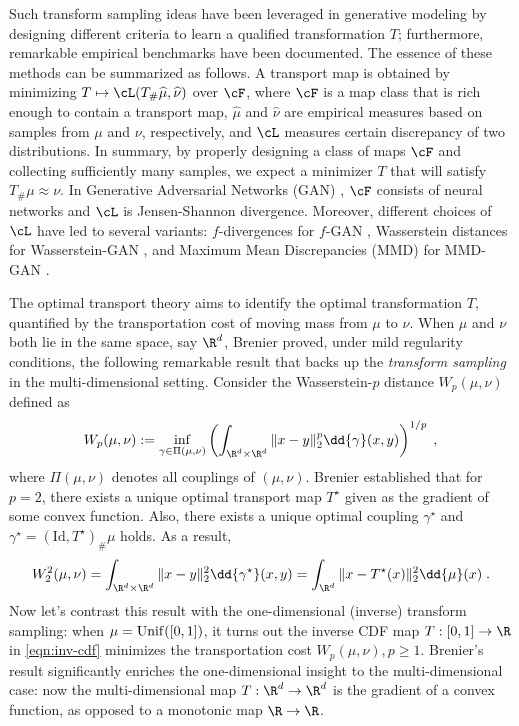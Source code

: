 \documentclass[11pt]{article}
\begin{document}
Such transform sampling ideas have been leveraged in generative modeling by designing different criteria to learn a qualified transformation $T$; furthermore, remarkable empirical benchmarks have been documented. The essence of these methods can be summarized as follows. A transport map is obtained by minimizing $T \mapsto \cL(T_{\#} \widehat{\mu}, \widehat{\nu})$ over $\cF$, where $\cF$ is a map class that is rich enough to contain a transport map, $\widehat{\mu}$ and $\widehat{\nu}$ are empirical measures based on samples from $\mu$ and $\nu$, respectively, and $\cL$ measures certain discrepancy of two distributions. In summary, by properly designing a class of maps $\cF$ and collecting sufficiently many samples, we expect a minimizer $T$ that will satisfy $T_{\#} \mu \approx \nu$. In Generative Adversarial Networks (GAN) \citep{goodfellow_2014}, $\cF$ consists of neural networks and $\cL$ is Jensen-Shannon divergence. Moreover, different choices of $\cL$ have led to several variants: $f$-divergences for $f$-GAN \citep{nowozin_2016}, Wasserstein distances for Wasserstein-GAN \citep{arjovsky_2017}, and Maximum Mean Discrepancies (MMD) for MMD-GAN \citep{dziugaite_roy_ghahramani_2015, li_swersky_zemel_2015}.

The optimal transport theory aims to identify the optimal transformation $T$, quantified by the transportation cost of moving mass from $\mu$ to $\nu$. When $\mu$ and $\nu$ both lie in the same space, say $\R^d$, Brenier \citep{brenier1991} proved, under mild regularity conditions, the following remarkable result that backs up the \textit{transform sampling} in the multi-dimensional setting. Consider the Wasserstein-$p$ distance $W_p(\mu, \nu)$ defined as
\begin{align*}
	W_p(\mu, \nu) := \inf_{\gamma \in \Pi(\mu, \nu)} \left(  \int_{\R^d \times \R^d} \| x - y \|_2^p \dd{\gamma}(x, y) \right)^{1/p} \;,
\end{align*}
where $\Pi(\mu, \nu)$ denotes all couplings of $(\mu, \nu)$.
Brenier established that for $p = 2$, there exists a unique optimal transport map $T^{\star}$ given as the gradient of some convex function. Also, there exists a unique optimal coupling $\gamma^{\star}$ and $\gamma^{\star} = (\mathrm{Id}, T^{\star})_{\#} \mu$ holds. As a result,
\begin{align*}
 	W_2^2(\mu, \nu) = \int_{\R^d \times \R^d} \|x - y\|_2^2 \dd{\gamma^{\star}}(x, y) = \int_{\R^d} \|x - T^\star(x)\|_2^2 \dd{\mu}(x) \;.
\end{align*}
Now let's contrast this result with the one-dimensional (inverse) transform sampling: when $\mu = {\rm Unif}([0,1])$, it turns out the inverse CDF map $T: [0, 1] \rightarrow \R$ in \eqref{eqn:inv-cdf} minimizes the transportation cost $W_p(\mu, \nu), p\geq 1$. Brenier's result significantly enriches the one-dimensional insight to the multi-dimensional case: now the multi-dimensional map $T:\R^d \rightarrow \R^d$ is the gradient of a convex function, as opposed to a monotonic map $\R \rightarrow \R$.
\end{document}
